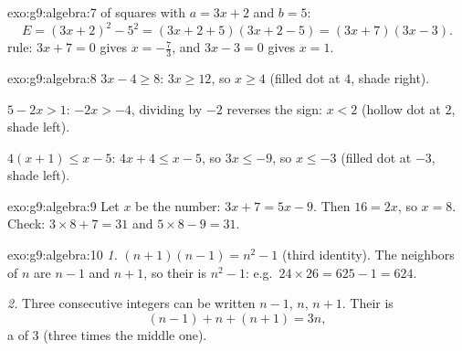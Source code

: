 \begin{solution}{exo:g9:algebra:7}
 of squares with $a = 3x + 2$ and $b = 5$:
\[
E = (3x + 2)^2 - 5^2 = (3x + 2 + 5)(3x + 2 - 5) = (3x + 7)(3x - 3).
\]
 rule: $3x + 7 = 0$ gives $x = -\frac73$, and $3x - 3 = 0$
gives $x = 1$.
\end{solution}

\begin{solution}{exo:g9:algebra:8}
$3x - 4 \geq 8$: $3x \geq 12$, so $x \geq 4$ (filled dot at $4$, shade
right).

$5 - 2x > 1$: $-2x > -4$, dividing by $-2$ reverses the sign: $x < 2$
(hollow dot at $2$, shade left).

$4(x+1) \leq x - 5$: $4x + 4 \leq x - 5$, so $3x \leq -9$, so
$x \leq -3$ (filled dot at $-3$, shade left).
\end{solution}

\begin{solution}{exo:g9:algebra:9}
Let $x$ be the number: $3x + 7 = 5x - 9$. Then $16 = 2x$, so $x = 8$.
Check: $3 \times 8 + 7 = 31$ and $5 \times 8 - 9 = 31$.
\end{solution}

\begin{solution}{exo:g9:algebra:10}
\emph{1.} $(n+1)(n-1) = n^2 - 1$ (third identity). The neighbors of $n$
are $n - 1$ and $n + 1$, so their  is $n^2 - 1$: e.g.\
$24 \times 26 = 625 - 1 = 624$.

\emph{2.} Three consecutive integers can be written $n - 1$, $n$,
$n + 1$. Their \omterm{def:g1:addition:def}{sum} is
\[
(n-1) + n + (n+1) = 3n ,
\]
a  of $3$ (three times the middle one).
\end{solution}

